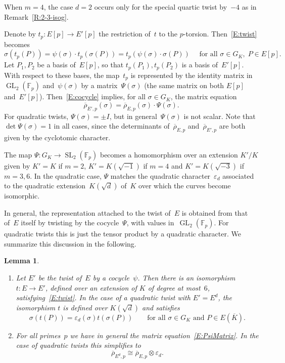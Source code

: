 \documentclass[twoside,leqno,symbols-for-thanks, draft]{rmi}
\numberwithin{equation}{section}
\newcommand{\Fp}{\mathbb{F}_p}
\newcommand{\Kbar}{{\overline{K}}}
\newcommand{\rhobar}{{\overline{\rho}}}
\newcommand{\eps}{\varepsilon}
\newcommand{\GL}{\operatorname{GL}}
\newcommand{\SL}{\operatorname{SL}}
\newtheorem{lemma}[theorem]{Lemma}
\theoremstyle{remark}
\begin{document}
When $m=4$, the case $d=2$ occurs only for the special
quartic twist by~$-4$ as in Remark~\ref{R:2-3-isog}.

Denote by $t_p : E[p] \to E'[p]$ the restriction of~$t$ to the
$p$-torsion. Then~\eqref{E:twist} becomes
\begin{equation}\label{E:cocycle}
  \sigma(t_p(P)) = \psi(\sigma) \cdot t_p(\sigma(P))
                 = t_p(\psi(\sigma)\cdot\sigma(P)) 
   \quad \text{ for all } \sigma \in G_K,
  \; P \in E[p].
\end{equation}
Let $P_1, P_2$ be a basis of~$E[p]$, so that $t_p(P_1), t_p(P_2)$ is a
basis of~$E'[p]$.  With respect to these bases, the map~$t_p$ is
represented by the identity matrix in~$\GL_2(\Fp)$ and~$\psi(\sigma)$
by a matrix~$\Psi(\sigma)$ (the same matrix on both $E[p]$
and~$E'[p]$).  Then~\eqref{E:cocycle} implies, for all $\sigma \in
G_K$, the matrix equation
\begin{equation} \label{E:PsiMatrix}
 \rhobar_{E',p}(\sigma) = \rhobar_{E,p}(\sigma) \cdot \Psi(\sigma). 
\end{equation}
For quadratic twists, $\Psi(\sigma)=\pm I$, but in
general~$\Psi(\sigma)$ is not scalar.  Note that $\det\Psi(\sigma)=1$
in all cases, since the determinants of~$\rhobar_{E,p}$
and~$\rhobar_{E',p}$ are both given by the cyclotomic character.

The map $\Psi:G_K\to\SL_2(\Fp)$ becomes a homomorphism over an
extension $K'/K$ given by $K'=K$ if $m=2$, $K'=K(\sqrt{-1})$ if $m=4$
and $K'=K(\sqrt{-3})$ if $m=3,6$. In the quadratic case, $\Psi$
matches the quadratic character~$\varepsilon_d$ associated to the
quadratic extension~$K(\sqrt{d})$ of~$K$ over which the curves become
isomorphic.

In general, the representation attached to the twist of~$E$ is
obtained from that of~$E$ itself by twisting by the cocycle~$\Psi$, with
values in~$\GL_2(\Fp)$.  For quadratic twists this is just the tensor product
by a quadratic character.
We summarize this discussion in the following.

\begin{lemma}\label{L:twist-rep} \hfill
  \begin{enumerate}
\item Let $E'$ be the twist of~$E$ by a cocycle~$\psi$. Then there is
  an isomorphism $t :E\to E'$, defined over an extension of $K$ of
  degree at most~$6$, satisfying~\eqref{E:twist}.
  In the case of a quadratic twist with $E'=E^d$, the isomorphism $t$
  is defined over $K(\sqrt{d})$ and satisfies
\begin{equation}\label{E:iso-twist}
\sigma(t (P)) = \eps_d(\sigma)t (\sigma(P)) \qquad\text{for
  all~$\sigma\in G_K$ and $P\in E(\Kbar)$}.
\end{equation}
\item For all primes~$p$ we have in general the matrix
  equation~\eqref{E:PsiMatrix}.
In the case of quadratic twists this simplifies to
  \begin{equation} \label{E:rho-twist}
  \rhobar_{E^d,p} \cong \rhobar_{E,p}\otimes\eps_d.
\end{equation}
\end{enumerate}
\end{lemma}
\end{document}

